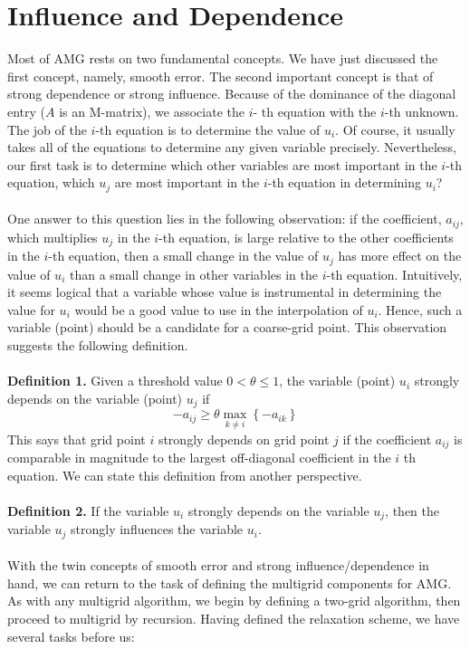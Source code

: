 \documentclass[11pt]{book}
\begin{document}
\section*{Influence and Dependence}
Most of AMG rests on two fundamental concepts. We have just discussed the first concept, namely, smooth error. The second important concept is that of strong dependence or strong influence. Because of the dominance of the diagonal entry ($A$ is an M-matrix), we associate the $i$- th equation with the $i$-th unknown. The job of the $i$-th equation is to determine the value of $u_{i}$. Of course, it usually takes all of the equations to determine any given variable precisely. Nevertheless, our first task is to determine which other variables are most important in the $i$-th equation, which $u_{j}$ are most important in the $i$-th equation in determining $u_{i}$? \\ \\
One answer to this question lies in the following observation: if the coefficient, $a_{i j}$, which multiplies $u_{j}$ in the $i$-th equation, is large relative to the other coefficients in the $i$-th equation, then a small change in the value of $u_{j}$ has more effect on the value of $u_{i}$ than a small change in other variables in the $i$-th equation. Intuitively, it seems logical that a variable whose value is instrumental in determining the value for $u_{i}$ would be a good value to use in the interpolation of $u_{i}$. Hence, such a variable (point) should be a candidate for a coarse-grid point. This observation suggests the following definition.\\ \\
\textbf{Definition 1.} Given a threshold value $0<\theta \leq 1$, the variable (point) $u_{i}$ strongly depends on the variable (point) $u_{j}$ if
$$
-a_{i j} \geq \theta \max _{k \neq i}\left\{-a_{i k}\right\}
$$
This says that grid point $i$ strongly depends on grid point $j$ if the coefficient $a_{i j}$ is comparable in magnitude to the largest off-diagonal coefficient in the $i$ th equation. We can state this definition from another perspective. \\ \\
\textbf{Definition 2.} If the variable $u_{i}$ strongly depends on the variable $u_{j}$, then the variable $u_{j}$ strongly influences the variable $u_{i}$. \\ \\ 
With the twin concepts of smooth error and strong influence/dependence in hand, we can return to the task of defining the multigrid components for AMG. As with any multigrid algorithm, we begin by defining a two-grid algorithm, then proceed to multigrid by recursion. Having defined the relaxation scheme, we have several tasks before us:
\end{document}
